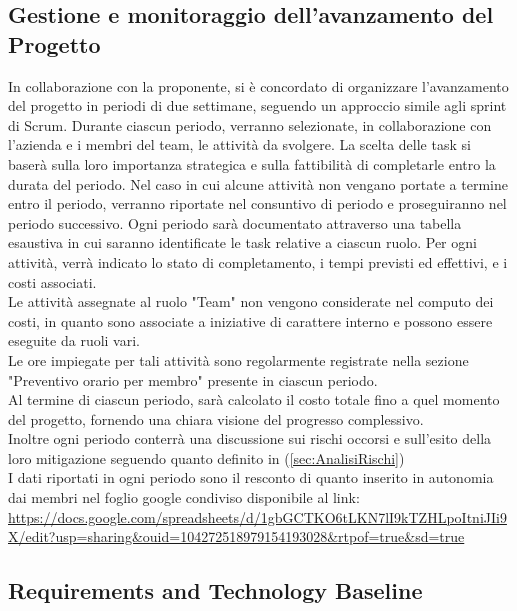 \documentclass{article}
\begin{document}
\subsection{Gestione e monitoraggio dell'avanzamento del Progetto}
In collaborazione con la proponente, si è concordato di organizzare l'avanzamento del progetto in periodi di due settimane, seguendo un approccio simile agli sprint di Scrum. Durante ciascun periodo, verranno selezionate, in collaborazione con l'azienda e i membri del team, le attività da svolgere.
La scelta delle task si baserà sulla loro importanza strategica e sulla fattibilità di completarle entro la durata del periodo. Nel caso in cui alcune attività non vengano portate a termine entro il periodo, verranno riportate nel consuntivo di periodo e proseguiranno nel periodo successivo.
Ogni periodo sarà documentato attraverso una tabella esaustiva in cui saranno identificate le task relative a ciascun ruolo. Per ogni attività, verrà indicato lo stato di completamento, i tempi previsti ed effettivi, e i costi associati.
\\Le attività assegnate al ruolo "Team" non vengono considerate nel computo dei costi, in quanto sono associate a iniziative di carattere interno e possono essere eseguite da ruoli vari.
\\ Le ore impiegate per tali attività sono regolarmente registrate nella sezione "Preventivo orario per membro" presente in ciascun periodo.
\\Al termine di ciascun periodo, sarà calcolato il costo totale fino a quel momento del progetto, fornendo una chiara visione del progresso complessivo.
\\Inoltre ogni periodo conterrà una discussione sui rischi occorsi e sull'esito della loro mitigazione seguendo quanto definito in (\ref{sec:AnalisiRischi})
\\I dati riportati in ogni periodo sono il resconto di quanto inserito in autonomia dai membri nel foglio google condiviso disponibile al link:
\linebreak\url{https://docs.google.com/spreadsheets/d/1gbGCTKO6tLKN7lI9kTZHLpoItniJIi9X/edit?usp=sharing&ouid=104272518979154193028&rtpof=true&sd=true}


\subsection{Requirements and Technology Baseline}
\end{document}
